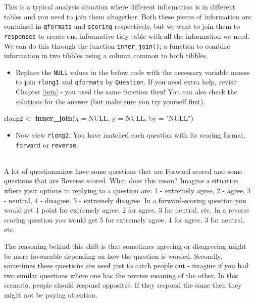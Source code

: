 \documentclass[]{book}
\newenvironment{Shaded}{\begin{snugshade}}{\end{snugshade}}
\newcommand{\DataTypeTok}[1]{\textcolor[rgb]{0.13,0.29,0.53}{#1}}
\newcommand{\KeywordTok}[1]{\textcolor[rgb]{0.13,0.29,0.53}{\textbf{#1}}}
\newcommand{\NormalTok}[1]{#1}
\newcommand{\OtherTok}[1]{\textcolor[rgb]{0.56,0.35,0.01}{#1}}
\newcommand{\StringTok}[1]{\textcolor[rgb]{0.31,0.60,0.02}{#1}}
\providecommand{\tightlist}{%
  \setlength{\itemsep}{0pt}\setlength{\parskip}{0pt}}
\newenvironment{try}
    {
    \hline\\
    }
    { 
    \\\\\hline
    }
\begin{document}
This is a typical analysis situation where different information is in different tables and you need to join them altogether. Both these pieces of information are contained in \texttt{qformats} and \texttt{scoring} respectively, but we want to join them to \texttt{responses} to create one informative tidy table with all the information we need. We can do this through the function \texttt{inner\_join()}; a function to combine information in two tibbles using a column common to both tibbles.

\begin{itemize}
\tightlist
\item
  Replace the \texttt{NULL} values in the below code with the necessary variable names to join \texttt{rlong1} and \texttt{qformats} by \texttt{Question}. If you need extra help, revisit Chapter \ref{join} - you used the same function then! You can also check the solutions for the answer (but make sure you try yourself first).
\end{itemize}

\begin{Shaded}
\begin{Highlighting}[]
\NormalTok{rlong2 <-}\StringTok{ }\KeywordTok{inner_join}\NormalTok{(}\DataTypeTok{x =} \OtherTok{NULL}\NormalTok{, }\DataTypeTok{y =} \OtherTok{NULL}\NormalTok{, }\DataTypeTok{by =} \StringTok{"NULL"}\NormalTok{)}
\end{Highlighting}
\end{Shaded}

\begin{itemize}
\tightlist
\item
  Now view \texttt{rlong2}. You have matched each question with its scoring format, \texttt{forward} or \texttt{reverse}.
\end{itemize}

\begin{try}
A lot of questionnaires have some questions that are Forward scored and
some questions that are Reverse scored. What does this mean? Imagine a
situation where your options in replying to a question are: 1 -
extremely agree, 2 - agree, 3 - neutral, 4 - disagree, 5 - extremely
disagree. In a forward-scoring question you would get 1 point for
extremely agree, 2 for agree, 3 for neutral, etc. In a reverse scoring
question you would get 5 for extremely agree, 4 for agree, 3 for
neutral, etc.

The reasoning behind this shift is that sometimes agreeing or
disagreeing might be more favourable depending on how the question is
worded. Secondly, sometimes these questions are used just to catch
people out - imagine if you had two similar questions where one has the
reverse meaning of the other. In this scenario, people should respond
opposites. If they respond the same then they might not be paying
attention.
\end{try}
\end{document}
